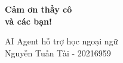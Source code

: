 \documentclass[notheorems,hyperref={bookmarks=true}]{beamer}
\begin{document}

\begin{frame}
    \begin{center}
         \Huge\bfseries Cảm ơn thầy cô\\và các bạn!
         
         \vspace{1cm}
         
         {\Large \textcolor{blue!80}{AI Agent hỗ trợ học ngoại ngữ}}\\[0.5cm]
         {\large Nguyễn Tuấn Tài - 20216959}
    \end{center}
\end{frame}
\end{document}
